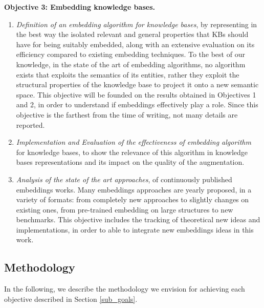 \noindent\textbf{Objective 3: Embedding knowledge bases.}
\begin{enumerate}
    \item \textit{Definition of an embedding algorithm for knowledge bases}, by representing in the best way the isolated relevant and general properties that KBs should have for being suitably embedded, along with an extensive evaluation on its efficiency compared to existing embedding techniques. To the best of our knowledge, in the state of the art of embedding algorithms, no algorithm exists that exploits the semantics of its entities, rather they exploit the structural properties of the knowledge base to project it onto a new semantic space. This objective will be founded on the results obtained in Objectives 1 and 2, in order to understand if embeddings effectively play a role. Since this objective is the farthest from the time of writing, not many details are reported.
    \item \textit{Implementation and Evaluation of the effectiveness of embedding algorithm} for knowledge bases, to show the relevance of this algorithm in knowledge bases representations and its impact on the quality of the augmentation.
    \item  \textit{Analysis of the state of the art approaches}, of continuously published embeddings works. Many embeddings approaches are yearly proposed, in a variety of formats: from completely new approaches to slightly changes on existing ones, from pre-trained embedding on large structures to new benchmarks. This objective includes the tracking of theoretical new ideas and implementations, in order to able to integrate new embeddings ideas in this work.
\end{enumerate}



\subsection{Methodology}\label{sub_methodology}
In the following, we describe the methodology we envision for achieving each objective described in Section \ref{sub_goals}.
\bigbreak

